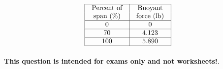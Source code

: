 $$\vbox{\offinterlineskip
\halign{\strut
\vrule \quad\hfil # \ \hfil & 
\vrule \quad\hfil # \ \hfil \vrule \cr
\noalign{\hrule}
%
Percent of & Buoyant  \cr
%
span (\%) & force (lb) \cr
%
\noalign{\hrule}
%
0 & 0 \cr
%
\noalign{\hrule}
%
70 & 4.123 \cr
%
\noalign{\hrule}
%
100 & 5.890 \cr
%
\noalign{\hrule}
} %
}$$ %








{\bf This question is intended for exams only and not worksheets!}.



